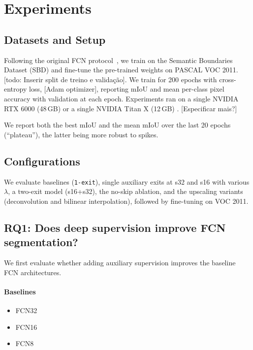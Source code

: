 \documentclass{article}
\begin{document}
\section{Experiments}

    \subsection{Datasets and Setup}

    Following the original FCN protocol~\cite{ref_fcn}, we train on the Semantic
    Boundaries Dataset (SBD) and fine-tune the pre-trained weights on PASCAL VOC
    2011. [todo: Inserir split de treino e validação]. We train for 200 epochs with
    cross-entropy loss, [Adam optimizer], reporting
    mIoU and mean per-class pixel accuracy with validation at each epoch. Experiments ran on a single NVIDIA RTX 6000 (48\,GB) or a single NVIDIA Titan X (12\,GB) . [Especificar mais?]

    We report both the best mIoU and the mean mIoU over the last 20 epochs
    (``plateau''), the latter being more robust to spikes.

    \subsection{Configurations}
    We evaluate baselines (\texttt{1-exit}), single auxiliary exits at s32 and s16
    with various $\lambda$, a two-exit model (s16+s32), the no-skip ablation, and
    the upscaling variants (deconvolution and bilinear interpolation), followed by
    fine-tuning on VOC 2011.

    \subsection{RQ1: Does deep supervision improve FCN segmentation?}

    We first evaluate whether adding auxiliary supervision improves the
    baseline FCN architectures.

    \paragraph{Baselines}
    \begin{itemize}
        \item FCN32
        \item FCN16
        \item FCN8
    \end{itemize}
\end{document}
